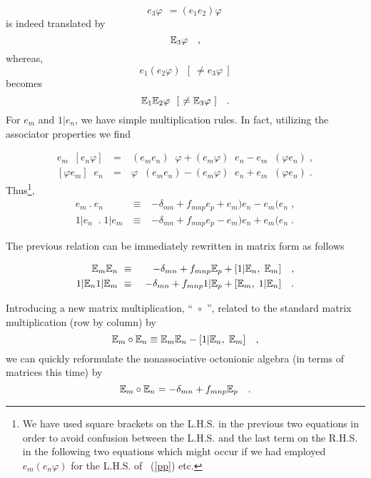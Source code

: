 \documentclass[a4paper,12pt]{book}
\begin{document}
\begin{equation}
e_{3}\varphi ~~=(e_{1}e_{2})\varphi ~
\end{equation}
is indeed translated by 
\begin{equation}
\Bbb{E}_{3}\varphi \quad ,
\end{equation}
whereas, 
\begin{equation}
e_{1}(e_{2}\varphi )~~[~\neq e_{3}\varphi ~]
\end{equation}
becomes 
\begin{equation}
\Bbb{E}_{1}\Bbb{E}_{2}\varphi ~~[~\neq \Bbb{E}_{3}\varphi ~]\quad .
\end{equation}
For $e_{m}$ and $1|e_{n}$, we have simple multiplication rules. In fact,
utilizing the associator properties we find

\begin{eqnarray}
e_{m}\;\;\left[ e_{n}\varphi \right] &~=~&(e_{m}e_{n})\;\;\varphi
+(e_{m}\varphi )\;\;e_{n}-e_{m}\;\;(\varphi e_{n})\;,  \label{pp} \\
\left[ \varphi e_{m}\right] \;\;e_{n} &~=~&\varphi
\;\;(e_{m}e_{n})-(e_{m}\varphi )\;\;e_{n}+e_{m}\;\;(\varphi e_{n})\;.
\end{eqnarray}
Thus\footnote{%
We have used square brackets on the L.H.S. in the previous two equations in
order to avoid confusion between the L.H.S. and the last term on the R.H.S.
in the following two equations which might occur if we had employed \ $%
e_{m}\left( e_{n}\varphi \right) $ for the L.H.S. of \ (\ref{pp}) etc.}, 
\begin{eqnarray}
e_{m}~.~e_{n} &~\equiv ~&-\delta _{mn}+f_{mnp}e_{p}+e_{m}\mathbf{)}%
e_{n}-e_{m}\mathbf{(}e_{n}\;, \\
1|e_{n}\;\;.\;1|e_{m} &~\equiv ~&-\delta _{mn}+f_{mnp}e_{p}-e_{m}\mathbf{)}%
e_{n}+e_{m}\mathbf{(}e_{n}\;.
\end{eqnarray}

The previous relation can be immediately rewritten in matrix form as follows 
\cite{shaeffer}

\begin{eqnarray}
\Bbb{E}_{m}\Bbb{E}_{n} &~\equiv ~&-\delta _{mn}+f_{mnp}\Bbb{E}_{p}+[1|\Bbb{E}%
_{n},\;\Bbb{E}_{m}]\quad , \\
1|\Bbb{E}_{n}1|\Bbb{E}_{m} &~\equiv ~&-\delta _{mn}+f_{mnp}1|\Bbb{E}_{p}+[%
\Bbb{E}_{m},\;1|\Bbb{E}_{n}]\quad .
\end{eqnarray}

Introducing a new matrix multiplication, ``~$\circ $~'', related to the
standard matrix multiplication (row by column) by 
\begin{equation}
\Bbb{E}_{m}\circ \Bbb{E}_{n}\equiv \Bbb{E}_{m}\Bbb{E}_{n}-[1|\Bbb{E}_{n},\;%
\Bbb{E}_{m}]\quad ,  \label{new}
\end{equation}
we can quickly reformulate the nonassociative octonionic algebra (in terms
of matrices this time) by 
\begin{equation}
\Bbb{E}_{m}\circ \Bbb{E}_{n}=-\delta _{mn}+f_{mnp}\Bbb{E}_{p}\quad .
\end{equation}
\end{document}
